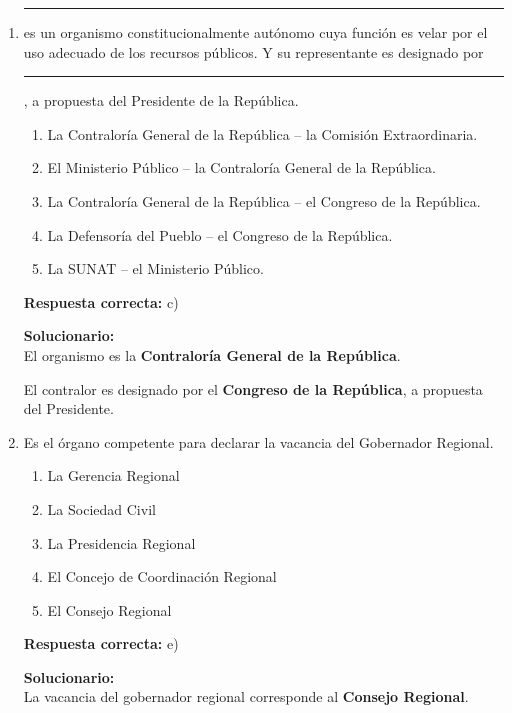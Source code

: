 \begin{enumerate}
	\item \rule{2cm}{0.15mm} es un organismo constitucionalmente autónomo cuya función es velar por el uso adecuado de los recursos públicos. Y su representante es designado por \rule{2cm}{0.15mm}, a propuesta del Presidente de la República.
	\begin{enumerate}[label=\alph*)]
		\item La Contraloría General de la República -- la Comisión Extraordinaria.
		\item El Ministerio Público -- la Contraloría General de la República.
		\item La Contraloría General de la República -- el Congreso de la República.
		\item La Defensoría del Pueblo -- el Congreso de la República.
		\item La SUNAT -- el Ministerio Público.
	\end{enumerate}
	\textbf{Respuesta correcta:} c)
	
	\vspace{2mm}
	\textbf{Solucionario:}\\
	El organismo es la \textbf{Contraloría General de la República}.
	
	El contralor es designado por el \textbf{Congreso de la República}, a propuesta del Presidente.
	

	
	\vspace{6mm}
	
	\item Es el órgano competente para declarar la vacancia del Gobernador Regional.
	\begin{enumerate}[label=\alph*)]
		\item La Gerencia Regional
		\item La Sociedad Civil
		\item La Presidencia Regional
		\item El Concejo de Coordinación Regional
		\item El Consejo Regional
	\end{enumerate}
	\textbf{Respuesta correcta:} e)
	
	\vspace{2mm}
	\textbf{Solucionario:}\\
	La vacancia del gobernador regional corresponde al \textbf{Consejo Regional}.
	

	
	\vspace{6mm}
\end{enumerate}

